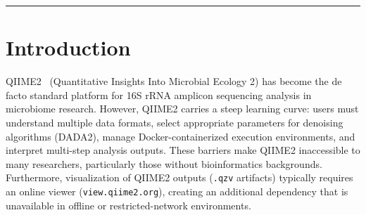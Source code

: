 \documentclass[12pt, a4paper]{article}
\begin{document}
\begin{abstract}
beta diversity --- with Benjamini-Hochberg FDR correction applied throughout.
Visualizations include t-SNE, UMAP, Raincloud plots, Volcano plots, LEfSe-style
effect size plots, UpSet diagrams, Ternary plots, Alluvial/Sankey diagrams, and more.
In v1.4, an \textbf{AI-driven adaptive analysis mode} (\texttt{--ai-driven}) was added.
A \texttt{DataInspector} directly parses exported TSV files (feature tables, alpha/beta diversity,
taxonomy) and executes Mann-Whitney~U, Kruskal-Wallis, and PERMANOVA tests in pure Python
without scipy dependency. Results are scored across 8 axes (statistical significance,
biological relevance, novelty, actionability, etc.) and compressed via power-iteration SVD
into 3 principal components. A literature-based \texttt{DecisionEngine} deterministically decides
next analysis steps: Anderson~(2001) for PERMANOVA$\rightarrow$betadisper logic,
Willis~(2019) for effect-size-driven alpha interpretation,
Gloor~et~al.~(2017) for compositional bias detection.
The LLM role is restricted to creative investigation hypotheses;
Python decisions always take priority via \texttt{merge\_with\_llm()},
and the system runs to completion even under LLM failure.
The entire workflow runs on the user's local machine, eliminating
dependencies on cloud services or paid APIs.
\end{abstract}

\vspace{4mm}
\hrule
\vspace{6mm}

\section{Introduction}

QIIME2~\cite{qiime2} (Quantitative Insights Into Microbial Ecology 2)
has become the de facto standard platform for 16S rRNA amplicon sequencing
analysis in microbiome research. However, QIIME2 carries a steep learning curve:
users must understand multiple data formats, select appropriate parameters for
denoising algorithms (DADA2), manage Docker-containerized execution environments,
and interpret multi-step analysis outputs. These barriers make QIIME2 inaccessible
to many researchers, particularly those without bioinformatics backgrounds.
Furthermore, visualization of QIIME2 outputs (\texttt{.qzv} artifacts) typically
requires an online viewer (\texttt{view.qiime2.org}), creating an additional
dependency that is unavailable in offline or restricted-network environments.
\end{document}
